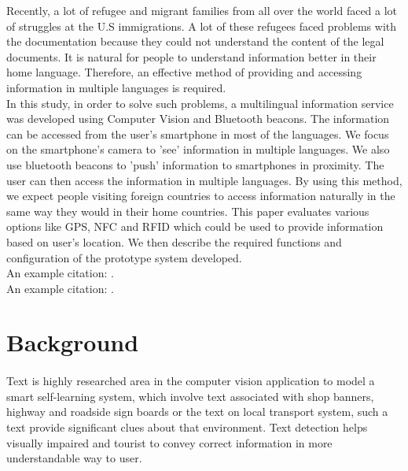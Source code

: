 \documentclass[12pt]{article}
\begin{document}
Recently, a lot of refugee and migrant families from all over the world faced a lot of struggles at the U.S immigrations. A lot of these refugees faced problems with the documentation because they could not understand the content of the legal documents. It is natural for people to understand information better in their home language. Therefore, an effective method of providing and accessing information in multiple languages is required. \\

In this study, in order to solve such problems, a multilingual information service was developed using Computer Vision and Bluetooth beacons. The information can be accessed from the user's smartphone in most of the languages. We focus on the smartphone's camera to 'see' information in multiple languages. We also use bluetooth beacons to 'push' information to smartphones in proximity. The user can then access the information in multiple languages. By using this method, we expect people visiting foreign countries to access information naturally in the same way they would in their home countries. This paper evaluates various options like GPS, NFC and RFID which could be used to provide information based on user's location. We then describe the required functions and configuration of the prototype system developed. \\

An example citation: \cite{graves-1995}.\\

An example citation: \cite{one}.\\



\section{Background}
\label{sect-background}

\paragraph{}Text is highly researched area in the computer vision application to model a smart self-learning system, which involve text associated with shop banners, highway and roadside sign boards or the text on local transport system, such a text provide significant clues about that environment. Text detection helps visually impaired and tourist to convey correct information in more understandable way to user.
\end{document}
